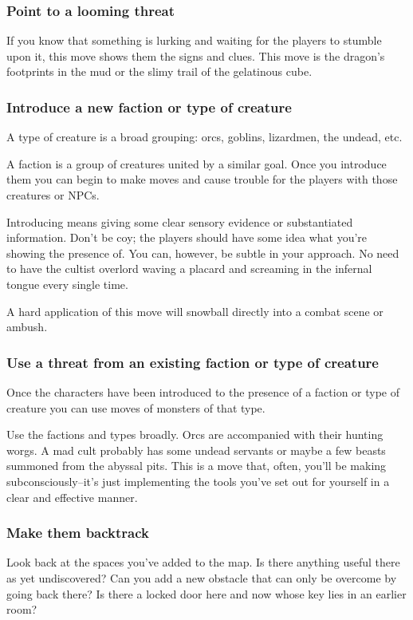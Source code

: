 \subsubsection{Point to a looming threat}


 If you know that something is lurking and waiting for the players to stumble upon it, this move shows them the signs and clues. This move is the dragon's footprints in the mud or the slimy trail of the gelatinous cube.
\subsubsection{Introduce a new faction or type of creature}


 A type of creature is a broad grouping: orcs, goblins, lizardmen, the undead, etc.


 A faction is a group of creatures united by a similar goal. Once you introduce them you can begin to make moves and cause trouble for the players with those creatures or NPCs.


 Introducing means giving some clear sensory evidence or substantiated information. Don't be coy; the players should have some idea what you're showing the presence of. You can, however, be subtle in your approach. No need to have the cultist overlord waving a placard and screaming in the infernal tongue every single time.


 A hard application of this move will snowball directly into a combat scene or ambush.
\subsubsection{Use a threat from an existing faction or type of creature}


 Once the characters have been introduced to the presence of a faction or type of creature you can use moves of monsters of that type.


 Use the factions and types broadly. Orcs are accompanied with their hunting worgs. A mad cult probably has some undead servants or maybe a few beasts summoned from the abyssal pits. This is a move that, often, you'll be making subconsciously--it's just implementing the tools you've set out for yourself in a clear and effective manner.
\subsubsection{Make them backtrack}


 Look back at the spaces you've added to the map. Is there anything useful there as yet undiscovered? Can you add a new obstacle that can only be overcome by going back there? Is there a locked door here and now whose key lies in an earlier room?


